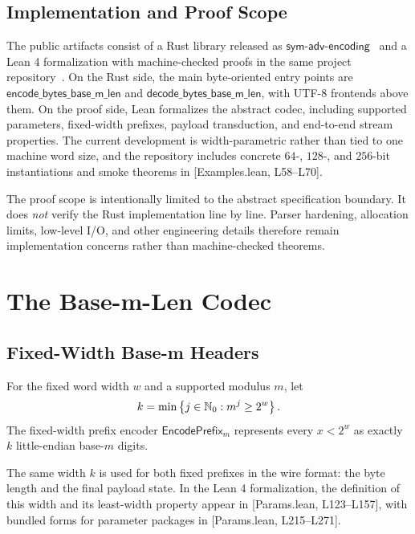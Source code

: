 \documentclass{system-security-article}
\providecommand{\href}[2]{#2}
\newcommand{\EncodePrefixM}{\mathsf{EncodePrefix}_m}
\newcommand{\BaseM}{base-\(m\)}
\newcommand{\LeanParams}[2]{\href{https://github.com/KyrylR/phd-symmetric-cryptography/blob/8e903222a7df1c4365592e4b16fa752a924b8977/lean/encoding-dr-1/EncodingProofs/BaseMLen/Params.lean\#L#1-L#2}{[Params.lean, L#1--L#2]}}
\newcommand{\LeanExamples}[2]{\href{https://github.com/KyrylR/phd-symmetric-cryptography/blob/8e903222a7df1c4365592e4b16fa752a924b8977/lean/encoding-dr-1/EncodingProofs/BaseMLen/Examples.lean\#L#1-L#2}{[Examples.lean, L#1--L#2]}}
\begin{document}
    \subsection{Implementation and Proof Scope}
    \label{subsec:boundary}

    The public artifacts consist of a Rust library released as \(\mathsf{sym\text{-}adv\text{-}encoding}\)~\cite{riabov2026encodingcrate}
    and a Lean 4 formalization with machine-checked proofs in the same project repository~\cite{riabov2026encodingrepo}.
    On the Rust side, the main byte-oriented entry points are \(\mathsf{encode\_bytes\_base\_m\_len}\) and
    \(\mathsf{decode\_bytes\_base\_m\_len}\), with UTF-8 frontends above them.
    On the proof side, Lean formalizes the abstract codec, including supported parameters, fixed-width prefixes,
    payload transduction, and end-to-end stream properties.
    The current development is width-parametric rather than tied to one machine word size, and the repository
    includes concrete \(64\)-, \(128\)-, and \(256\)-bit instantiations and smoke theorems in \LeanExamples{58}{70}.

    The proof scope is intentionally limited to the abstract specification boundary.
    It does \emph{not} verify the Rust implementation line by line.
    Parser hardening, allocation limits, low-level I/O, and other engineering details therefore
    remain implementation concerns rather than machine-checked theorems.

    \section{The Base-m-Len Codec}
    \label{sec:codec}

    \subsection{Fixed-Width Base-m Headers}
    \label{subsec:prefix}

    \begin{definition}
        \label{def:prefix-width}
        For the fixed word width \(w\) and a supported modulus \(m\), let
        \[
            k = \min \left\{ j \in \mathbb{N}_0 : m^j \ge 2^{w} \right\}.
        \]
        The fixed-width prefix encoder \(\EncodePrefixM\) represents every \(x < 2^{w}\)
        as exactly \(k\) little-endian \BaseM{} digits.
    \end{definition}

    The same width \(k\) is used for both fixed prefixes in the wire format: the byte length and the final payload state.
    In the Lean 4 formalization, the definition of this width and its least-width property appear in \LeanParams{123}{157},
    with bundled forms for parameter packages in \LeanParams{215}{271}.
\end{document}

